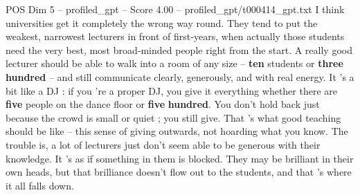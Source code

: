 \begin{textsample}{POS Dim 5 – profiled\_gpt – Score 4.00 – profiled\_gpt/t000414\_gpt.txt}  \label{ex:f5_pos_028}
I think universities get it completely the wrong way round.
They tend to put the weakest, narrowest lecturers in front of first‑years, when actually those students need the very best, most broad‑minded people right from the start.
A really good lecturer should be able to walk into a room of any size – \textbf{ten} students or \textbf{three} \textbf{hundred} – and still communicate clearly, generously, and with real energy.
It ’s a bit like a DJ : if you ’re a proper DJ, you give it everything whether there are \textbf{five} people on the dance floor or \textbf{five} \textbf{hundred}.
You don't hold back just because the crowd is small or quiet ; you still give.
That ’s what good teaching should be like – this sense of giving outwards, not hoarding what you know.
The trouble is, a lot of lecturers just don't seem able to be generous with their knowledge.
It ’s as if something in them is blocked.
They may be brilliant in their own heads, but that brilliance doesn't flow out to the students, and that ’s where it all falls down.

\end{textsample}
